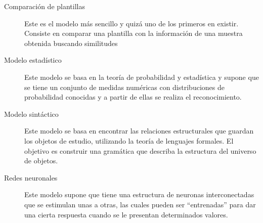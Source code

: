 \begin{description}

\item[Comparaci\'on de plantillas]{Este es el modelo m\'as sencillo y quiz\'a uno de los primeros en existir. Consiste en comparar una plantilla con la informaci\'on de una muestra obtenida buscando similitudes}
\item[Modelo estad\'istico]{Este modelo se basa en la teor\'ia de probabilidad y estad\'istica y supone que se tiene un conjunto de medidas num\'ericas con distribuciones de probabilidad conocidas y a partir de ellas se realiza el reconocimiento.}
\item[Modelo sint\'actico]{Este modelo se basa en encontrar las relaciones estructurales que guardan los objetos de estudio, utilizando la teor\'ia de lenguajes formales. El objetivo es construir una gram\'atica que describa la estructura del universo de objetos.}
\item[Redes neuronales]{Este modelo supone que tiene una estructura de neuronas interconectadas que se estimulan unas a otras, las cuales pueden ser ``entrenadas'' para dar una cierta respuesta cuando se le presentan determinados valores.}

\end{description}
